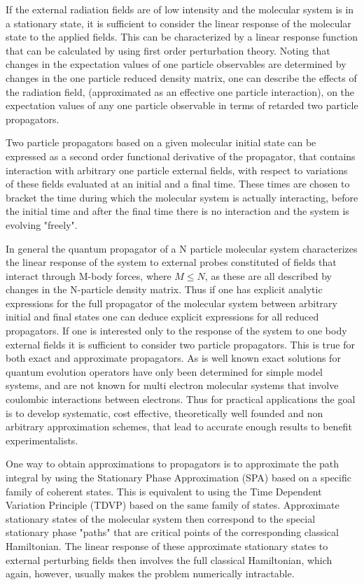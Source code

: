 \documentclass[aps,preprint]{revtex4}%
\begin{document}
If the external radiation fields are of low intensity and the molecular system
is in a stationary state, it is sufficient to consider the linear response of
the molecular state to the applied fields. This can be characterized by a
linear response function that can be calculated by using first order
perturbation theory. Noting that changes in the expectation values of one
particle observables are determined by changes in the one particle reduced
density matrix, one can describe the effects of the radiation field,
(approximated as an effective one particle interaction), on the expectation
values of any one particle observable in terms of retarded two particle propagators.

Two particle propagators based on a given molecular initial state can be
expressed as a second order functional derivative of the propagator, that
contains interaction with arbitrary one particle external fields, with respect
to variations of these fields evaluated at an initial and a final time. These
times are chosen to bracket the time during which the molecular system is
actually interacting, before the initial time and after the final time there
is no interaction and the system is evolving "freely".

In general the quantum propagator of a N particle molecular system
characterizes the linear response of the system to external probes constituted
of fields that interact through M-body forces, where $M\leq N$, as these are
all described by changes in the N-particle density matrix. Thus if one has
explicit analytic expressions for the full propagator of the molecular system
between arbitrary initial and final states one can deduce explicit expressions
for all reduced propagators. If one is interested only to the response of the
system to one body external fields it is sufficient to consider two particle
propagators. This is true for both exact and approximate propagators. As is
well known exact solutions for quantum evolution operators have only been
determined for simple model systems, and are not known for multi electron
molecular systems that involve coulombic interactions between electrons. Thus
for practical applications the goal is to develop systematic, cost effective,
theoretically well founded and non arbitrary approximation schemes, that lead
to accurate enough results to benefit experimentalists.

One way to obtain approximations to propagators is to approximate the path
integral by using the Stationary Phase Approximation (SPA) based on a specific
family of coherent states. This is equivalent to using the Time Dependent
Variation Principle (TDVP) based on the same family of states. Approximate
stationary states of the molecular system then correspond to the special
stationary phase "paths" that are critical points of the corresponding
classical Hamiltonian. The linear response of these approximate stationary
states to external perturbing fields then involves the full classical
Hamiltonian, which again, however, usually makes the problem numerically intractable.
\end{document}
